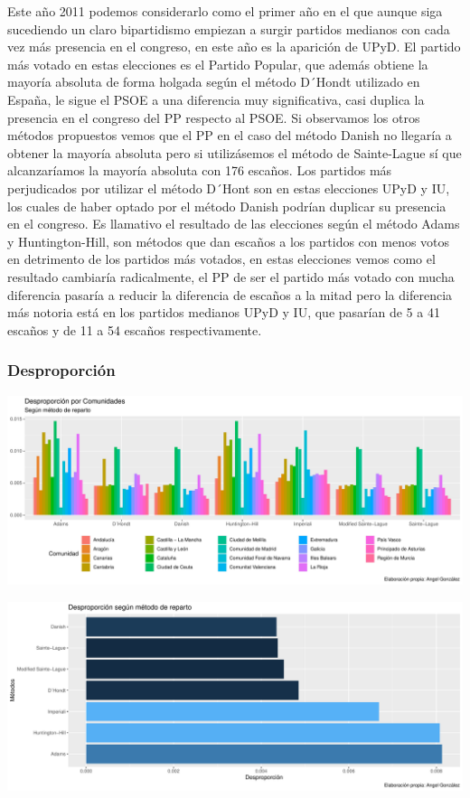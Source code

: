\documentclass[12pt,a4paper,]{book}
\numberwithin{dummy}{section}
\theoremstyle{ocrenumbox}
\theoremstyle{blacknumex}
\theoremstyle{blacknumbox}
\theoremstyle{ocrenum}
\theoremstyle{ocrenum}
\begin{document}
Este año 2011 podemos considerarlo como el primer año en el que aunque
siga sucediendo un claro bipartidismo empiezan a surgir partidos
medianos con cada vez más presencia en el congreso, en este año es la
aparición de UPyD. El partido más votado en estas elecciones es el
Partido Popular, que además obtiene la mayoría absoluta de forma holgada
según el método D´Hondt utilizado en España, le sigue el PSOE a una
diferencia muy significativa, casi duplica la presencia en el congreso
del PP respecto al PSOE. Si observamos los otros métodos propuestos
vemos que el PP en el caso del método Danish no llegaría a obtener la
mayoría absoluta pero si utilizásemos el método de Sainte-Lague sí que
alcanzaríamos la mayoría absoluta con 176 escaños. Los partidos más
perjudicados por utilizar el método D´Hont son en estas elecciones UPyD
y IU, los cuales de haber optado por el método Danish podrían duplicar
su presencia en el congreso. Es llamativo el resultado de las elecciones
según el método Adams y Huntington-Hill, son métodos que dan escaños a
los partidos con menos votos en detrimento de los partidos más votados,
en estas elecciones vemos como el resultado cambiaría radicalmente, el
PP de ser el partido más votado con mucha diferencia pasaría a reducir
la diferencia de escaños a la mitad pero la diferencia más notoria está
en los partidos medianos UPyD y IU, que pasarían de 5 a 41 escaños y de
11 a 54 escaños respectivamente.

\hypertarget{desproporciuxf3n-10}{%
\subsubsection{Desproporción}\label{desproporciuxf3n-10}}

\begin{center}\includegraphics[width=0.95\linewidth]{figurasR/unnamed-chunk-102-1} \end{center}

\begin{center}\includegraphics[width=0.95\linewidth]{figurasR/unnamed-chunk-102-2} \end{center}
\end{document}
